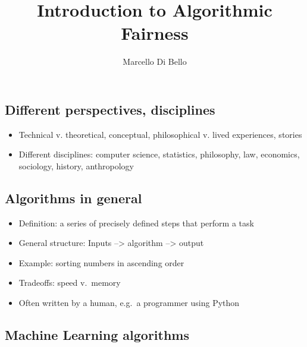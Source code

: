 \documentclass{tufte-handout}
\title{ \sc Introduction to Algorithmic Fairness}
\author[Marcello Di Bello]{Marcello Di Bello}
\date{} %
\begin{document}
\maketitle

\subsection{Different perspectives, disciplines}

\begin{itemize}

 \item[] Technical v. theoretical, conceptual, philosophical v. lived experiences, stories
\item[] Different disciplines: computer science, statistics, philosophy, law, economics,  sociology, history, anthropology

\end{itemize}

\subsection{Algorithms in general}
 
 \begin{itemize}

 \item[] Definition: a series of precisely defined steps that perform a task
\item[] General structure: Inputs --> algorithm --> output
\item[] Example: sorting numbers in ascending order
\item[] Tradeoffs: speed v.\ memory 
\item[] Often written by a human, e.g.\ a programmer using Python

\end{itemize}


\subsection{Machine Learning algorithms}
\end{document}
